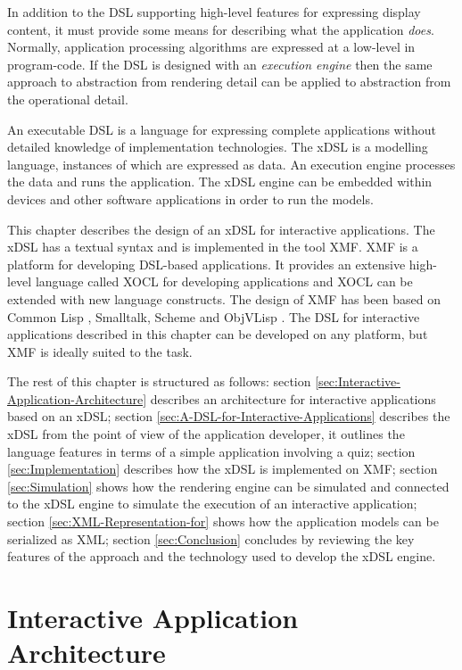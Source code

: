 In addition to the DSL supporting high-level features for expressing
display content, it must provide some means for describing what the
application \emph{does}. Normally, application processing algorithms
are expressed at a low-level in program-code. If the DSL is designed
with an \emph{execution engine} then the same approach to abstraction
from rendering detail can be applied to abstraction from the operational
detail.

An executable DSL is a language for expressing complete applications
without detailed knowledge of implementation technologies. The xDSL
is a modelling language, instances of which are expressed as data.
An execution engine processes the data and runs the application. The
xDSL engine can be embedded within devices and other software applications
in order to run the models.

This chapter describes the design of an xDSL for interactive applications.
The xDSL has a textual syntax and is implemented in the tool XMF.
XMF is a platform for developing DSL-based applications. It provides
an extensive high-level language called XOCL for developing applications
and XOCL can be extended with new language constructs. The design
of XMF has been based on Common Lisp \cite{Lisp}, Smalltalk, Scheme
\cite{Scheme} and ObjVLisp \cite{objVlisp}. The DSL for interactive
applications described in this chapter can be developed on any platform,
but XMF is ideally suited to the task.

The rest of this chapter is structured as follows: section \ref{sec:Interactive-Application-Architecture}
describes an architecture for interactive applications based on an
xDSL; section \ref{sec:A-DSL-for-Interactive-Applications} describes
the xDSL from the point of view of the application developer, it outlines
the language features in terms of a simple application involving a
quiz; section \ref{sec:Implementation} describes how the xDSL is
implemented on XMF; section \ref{sec:Simulation} shows how the rendering
engine can be simulated and connected to the xDSL engine to simulate
the execution of an interactive application; section \ref{sec:XML-Representation-for}
shows how the application models can be serialized as XML; section
\ref{sec:Conclusion} concludes by reviewing the key features of the
approach and the technology used to develop the xDSL engine.


\section{Interactive Application Architecture\label{sec:Interactive-Application-Architecture}}

